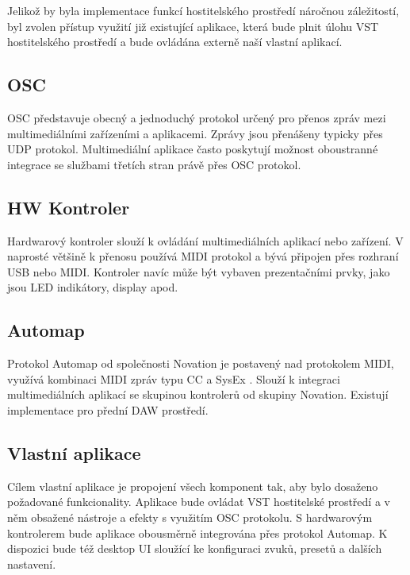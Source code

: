 \documentclass[thesis=M,czech]{FITthesis}[2019/03/06]
\begin{document}
			Jelikož by byla implementace funkcí hostitelského prostředí náročnou záležitostí, byl zvolen přístup využití
			již existující aplikace, která bude plnit úlohu VST hostitelského prostředí a bude ovládána externě naší vlastní aplikací.
			
		\subsection{OSC}		
			OSC\cite{osc} představuje obecný a jednoduchý protokol určený pro přenos zpráv mezi multimediálními zařízeními a aplikacemi.
			Zprávy jsou přenášeny typicky přes UDP protokol. Multimediální aplikace často poskytují možnost oboustranné integrace
			se službami třetích stran právě přes OSC protokol.

		\subsection{HW Kontroler}
			Hardwarový kontroler slouží k ovládání multimediálních aplikací nebo zařízení. V naprosté většině k přenosu používá MIDI protokol
			a bývá připojen přes rozhraní USB nebo MIDI. Kontroler navíc může být vybaven prezentačními prvky, jako jsou LED indikátory, display apod.

		\subsection{Automap}
			Protokol Automap od společnosti Novation je postavený nad protokolem MIDI, využívá kombinaci MIDI zpráv typu CC a SysEx \cite{automap}.
			Slouží k integraci multimediálních aplikací se skupinou kontrolerů od skupiny Novation. Existují implementace pro 
			přední DAW prostředí.

		\subsection{Vlastní aplikace}
			Cílem vlastní aplikace je propojení všech komponent tak, aby bylo dosaženo požadované funkcionality.
			Aplikace bude ovládat VST hostitelské prostředí a v něm obsažené nástroje a efekty s využitím OSC protokolu.
			S hardwarovým kontrolerem bude aplikace obousměrně integrována přes protokol Automap.
			K dispozici bude též desktop UI sloužící ke konfiguraci zvuků, presetů a dalších nastavení.
\clearpage
\end{document}
